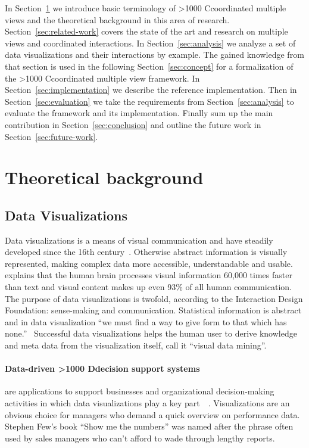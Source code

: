 \documentclass{article}
\newcommand\hmm[1]{\ifnum\ifhmode\spacefactor\else2000\fi>1000 \uppercase{#1}\else#1\fi}
\newcommand{\cmv}{\hmm{c}oordinated multiple view}
\newcommand{\cmvs}{\hmm{c}oordinated multiple views}
\newcommand{\dss}{\hmm{d}ecision support systems}
\begin{document}
In Section~\ref{sec:theory} we introduce basic terminology of \cmvs{} and the theoretical background in this area of research.
Section~\ref{sec:related-work} covers the state of the art and research on multiple views and coordinated interactions.
In Section~\ref{sec:analysis} we analyze a set of data visualizations and their interactions by example.
The gained knowledge from that section is used in the following Section~\ref{sec:concept} for a formalization of the \cmv{} framework.
In Section~\ref{sec:implementation} we describe the reference implementation.
Then in Section~\ref{sec:evaluation} we take the requirements from Section~\ref{sec:analysis} to evaluate the framework and its implementation.
Finally sum up the main contribution in Section~\ref{sec:conclusion} and outline the future work in Section~\ref{sec:future-work}.

\clearpage
\section{Theoretical background}\label{sec:theory}

\subsection{Data Visualizations}
Data visualizations is a means of visual communication and have steadily developed since the 16th century~\cite{Friendly2001}.
Otherwise abstract information is visually represented, making complex data more accessible, understandable and usable.
\textcite{Kusinitz2014} explains that the human brain processes visual information 60,000 times faster than text and visual content makes up even 93\% of all human communication.
The purpose of data visualizations is twofold, according to the Interaction Design Foundation: sense-making and communication.
Statistical information is abstract and in data visualization ``we must find a way to give form to that which has none.''~\cite{Few2013}
Successful data visualizations helps the human user to derive knowledge and meta data from the visualization itself, \textcite{Nocke2002} call it ``visual data mining''.

\paragraph{Data-driven \dss{}} are applications to support businesses and organizational decision-making activities in which data visualizations play a key part~\cite{Nada2007}~\cite{Poleto2015}.
Visualizations are an obvious choice for managers who demand a quick overview on performance data.
Stephen Few's book ``Show me the numbers'' was named after the phrase often used by sales managers who can't afford to wade through lengthy reports.
\end{document}
